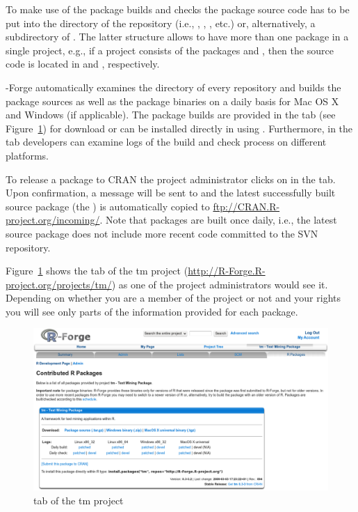 To make use of the package builds and checks
the package source code has to be put into the  directory
of the repository (i.e., ,
, , etc.) or, alternatively, a 
subdirectory of . The latter structure allows to
have more than one package in a single project, e.g., if
a project consists of the packages  and , then the
source code is located in  and ,
respectively.

\R{}-Forge automatically examines the  directory of
every repository and builds the package sources as well as the package
binaries on a daily basis for Mac OS X and Windows (if applicable). The
package builds 
are provided in the  tab (see
Figure~\ref{fig:rpackages_tab}) for download or can be 
installed directly in \R{} using 
. Furthermore, in the  tab developers can examine logs of the build and check
process on different platforms. 

To release a package to CRAN the project administrator clicks on
 in the  tab. Upon
confirmation, a message will be sent to  and
the latest successfully built source package (the ) is
automatically 
copied to \url{ftp://CRAN.R-project.org/incoming/}. Note that packages
are built once daily, i.e., the latest source package does not
include more recent code committed to the SVN repository. 

Figure~\ref{fig:rpackages_tab} shows the  tab of the
tm project (\url{http://R-Forge.R-project.org/projects/tm/}) as one of
the project administrators would see it. Depending on whether you are
a member of the project or not and your rights you will see only parts
of the information provided for each package.

\begin{figure}[th]
\centering
\includegraphics{rforge_tm_packages_developer_snapshot.png}
\caption{ tab of the tm project}
\label{fig:rpackages_tab}
\end{figure}

